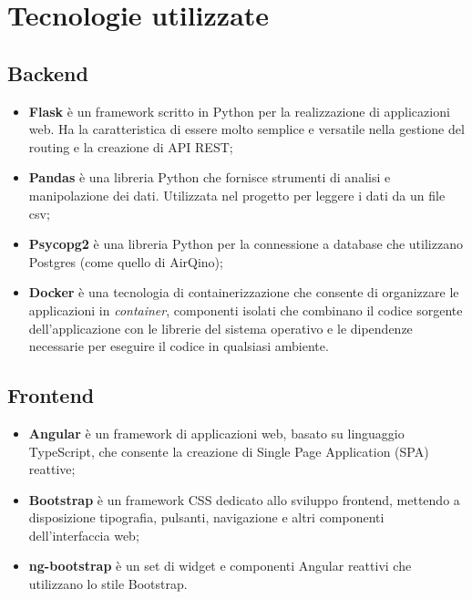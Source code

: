 \section{Tecnologie utilizzate}\label{sec:tecnologie}

\subsection{Backend}\label{ssec:interfaccia-backend}

\begin{itemize}
  \item \textbf{Flask} \cite{flask} è un framework scritto in Python per la realizzazione di applicazioni web. Ha la caratteristica di essere molto semplice e versatile nella gestione del routing e la creazione di API REST;
  \item \textbf{Pandas} \cite{pandas} è una libreria Python che fornisce strumenti di analisi e manipolazione dei dati. Utilizzata nel progetto per leggere i dati da un file csv;
  \item \textbf{Psycopg2} \cite{psycopg2} è una libreria Python per la connessione a database che utilizzano Postgres (come quello di AirQino);
  \item \textbf{Docker} \cite{docker} è una tecnologia di containerizzazione che consente di organizzare le applicazioni in \textit{container}, componenti isolati che combinano il codice sorgente dell'applicazione con le librerie del sistema operativo e le dipendenze necessarie per eseguire il codice in qualsiasi ambiente. 
\end{itemize}

\subsection{Frontend}\label{ssec:interfaccia-frontend}

\begin{itemize}
  \item \textbf{Angular} \cite{angular} è un framework di applicazioni web, basato su linguaggio TypeScript, che consente la creazione di Single Page Application (SPA) reattive;
  \item \textbf{Bootstrap} \cite{bootstrap} è un framework CSS dedicato allo sviluppo frontend, mettendo a disposizione tipografia, pulsanti, navigazione e altri componenti dell'interfaccia web;
  \item \textbf{ng-bootstrap} \cite{ng-bootstrap} è un set di widget e componenti Angular reattivi che utilizzano lo stile Bootstrap.
\end{itemize}

